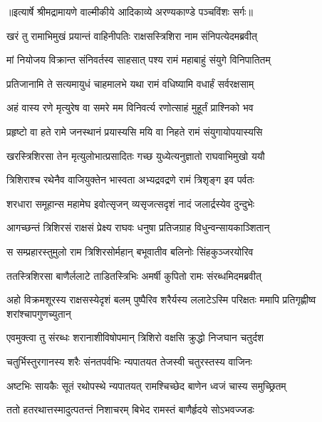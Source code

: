 {॥इत्यार्षे श्रीमद्रामायणे वाल्मीकीये आदिकाव्ये अरण्यकाण्डे पञ्चविंशः सर्गः॥}


\twolineshloka
{खरं तु रामाभिमुखं प्रयान्तं वाहिनीपतिः}
{राक्षसस्त्रिशिरा नाम संनिपत्येदमब्रवीत्} %

\twolineshloka
{मां नियोजय विक्रान्त संनिवर्तस्व साहसात्}
{पश्य रामं महाबाहुं संयुगे विनिपातितम्} %

\twolineshloka
{प्रतिजानामि ते सत्यमायुधं चाहमालभे}
{यथा रामं वधिष्यामि वधार्हं सर्वरक्षसाम्} %

\twolineshloka
{अहं वास्य रणे मृत्युरेष वा समरे मम}
{विनिवर्त्य रणोत्साहं मुहूर्तं प्राश्निको भव} %

\twolineshloka
{प्रहृष्टो वा हते रामे जनस्थानं प्रयास्यसि}
{मयि वा निहते रामं संयुगायोपयास्यसि} %

\twolineshloka
{खरस्त्रिशिरसा तेन मृत्युलोभात्प्रसादितः}
{गच्छ युध्येत्यनुज्ञातो राघवाभिमुखो ययौ} %

\twolineshloka
{त्रिशिराश्च रथेनैव वाजियुक्तेन भास्वता}
{अभ्यद्रवद्रणे रामं त्रिशृङ्ग इव पर्वतः} %

\twolineshloka
{शरधारा समूहान्स महामेघ इवोत्सृजन्}
{व्यसृजत्सदृशं नादं जलार्द्रस्येव दुन्दुभेः} %

\twolineshloka
{आगच्छन्तं त्रिशिरसं राक्षसं प्रेक्ष्य राघवः}
{धनुषा प्रतिजग्राह विधुन्वन्सायकाञ्शितान्} %

\twolineshloka
{स सम्प्रहारस्तुमुलो राम त्रिशिरसोर्महान्}
{बभूवातीव बलिनोः सिंहकुञ्जरयोरिव} %

\twolineshloka
{ततस्त्रिशिरसा बाणैर्ललाटे ताडितस्त्रिभिः}
{अमर्षी कुपितो रामः संरब्धमिदमब्रवीत्} %

\threelineshloka
{अहो विक्रमशूरस्य राक्षसस्येदृशं बलम्}
{पुष्पैरिव शरैर्यस्य ललाटेऽस्मि परिक्षतः}
{ममापि प्रतिगृह्णीष्व शरांश्चापगुणच्युतान्} %

\twolineshloka
{एवमुक्त्वा तु संरब्धः शरानाशीविषोपमान्}
{त्रिशिरो वक्षसि क्रुद्धो निजघान चतुर्दश} %

\twolineshloka
{चतुर्भिस्तुरगानस्य शरैः संनतपर्वभिः}
{न्यपातयत तेजस्वी चतुरस्तस्य वाजिनः} %

\twolineshloka
{अष्टभिः सायकैः सूतं रथोपस्थे न्यपातयत्}
{रामश्चिच्छेद बाणेन ध्वजं चास्य समुच्छ्रितम्} %

\twolineshloka
{ततो हतरथात्तस्मादुत्पतन्तं निशाचरम्}
{बिभेद रामस्तं बाणैर्हृदये सोऽभवज्जडः} %

